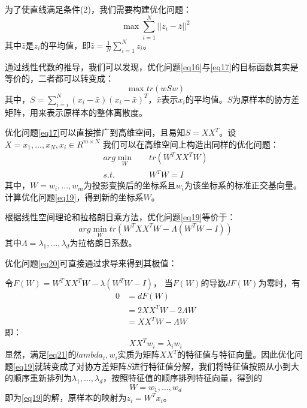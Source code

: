 \documentclass[12pt,a4paper]{article}
\begin{document}
为了使直线满足条件(2)，我们需要构建优化问题：
\begin{equation}
\label{eq17}
\max \sum_{i = 1}^{N}||z_{i} - \bar{z}||^{2}
\end{equation}
其中$\bar{z}$是$z_{i}$的平均值，即$\bar{z} = \frac{1}{N}\sum_{i = 1}^{N}z_{i}$。

通过线性代数的推导，我们可以发现，优化问题\eqref{eq16}与\eqref{eq17}的目标函数其实是等价的，二者都可以转变成：
\begin{equation}
\label{eq18}
\max tr(w S w)
\end{equation}
其中，$S = \sum_{i = i}^{N}(x_{i} - \bar{x})(x_{i} - \bar{x})^{T}$，$\bar{x}$表示$x_{i}$的平均值。$S$为原样本的协方差矩阵，用来表示原样本的整体离散度。

优化问题\eqref{eq17}可以直接推广到高维空间，且易知$S = XX^{T}$。设$X = {x_{1}, ... , x_{N}}, x_{i} \in R^{m  \times N}$ 我们可以在高维空间上构造出同样的优化问题：
\begin{equation}
\label{eq19}
\begin{split}
arg\min_{W} & \quad tr(W^{T}XX^{T}W) \\
s.t. & \quad W^{T}W = I
\end{split}
\end{equation}
其中，$W = {w_{i}, ... , w_{m}}$为投影变换后的坐标系且$w_{i}$为该坐标系的标准正交基向量。计算优化问题\eqref{eq19}，得到新的坐标系$W$。

根据线性空间理论和拉格朗日乘方法，优化问题\eqref{eq19}等价于：
\begin{equation}
\label{eq20}
arg \min_{W} tr(W^{T}XX^{T}W - \Lambda (W^{T}W - I))
\end{equation}
其中$\Lambda = {\lambda_{1}, ... , \lambda_{d}}$为拉格朗日系数。

优化问题\eqref{eq20}可直接通过求导来得到其极值：

令$F(W) = W^{T}XX^{T}W - \lambda (W^{T}W - I)$，
当$F(W)$的导数$dF(W)$为零时，有
\begin{align*}
0 &= dF(W)\\
  &= 2XX^{T}W - 2\Lambda W\\
  &= XX^{T}W - \Lambda W  
\end{align*}
即：
\begin{equation}
\label{eq21}
XX^{T}w_{i} = \lambda_{i} w_{i}
\end{equation}
显然，满足\eqref{eq21}的$lambda_{i}, w_{i}$实质为矩阵$XX^{T}$的特征值与特征向量。因此优化问题\eqref{eq19}就转变成了对协方差矩阵$S$进行特征值分解，我们将特征值按照从小到大的顺序重新排列为${\lambda_{1}, ... , \lambda_{d}}$，按照特征值的顺序排列特征向量，得到的
\begin{equation*}
W = {w_{1}, ... , w_{d}}
\end{equation*}
即为\eqref{eq19}的解，原样本的映射为$z_{i} = W^{T}x_{i}$。
\end{document}
